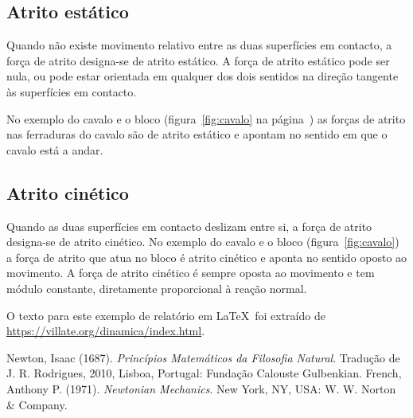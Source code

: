 \documentclass[a4paper,12pt,twosided]{report}
\begin{document}
\subsection{Atrito estático}
Quando não existe movimento relativo entre as duas superfícies em
contacto, a força de atrito designa-se de atrito estático. A força de
atrito estático pode ser nula, ou pode estar orientada em qualquer dos
dois sentidos na direção tangente às superfícies em contacto.

No exemplo do cavalo e o bloco (figura~\ref{fig:cavalo} na
página~\pageref{fig:cavalo}) as forças de atrito nas ferraduras do
cavalo são de atrito estático e apontam no sentido em que o cavalo
está a andar.

\subsection{Atrito cinético}
Quando as duas superfícies em contacto deslizam entre si, a força de
atrito designa-se de atrito cinético. No exemplo do cavalo e o bloco
(figura~\ref{fig:cavalo}) a força de atrito que atua no bloco é atrito
cinético e aponta no sentido oposto ao movimento.
A força de atrito cinético é sempre oposta ao movimento e tem módulo
constante, diretamente proporcional à reação normal.

O texto para este exemplo de relatório em \LaTeX\ foi extraído de
\url{https://villate.org/dinamica/index.html}.

\begin{thebibliography}{9}
  Newton, Isaac (1687). \emph{Princípios Matemáticos da Filosofia
    Natural}. Tradução de J. R. Rodrigues, 2010, Lisboa, Portugal:
  Fundação Calouste Gulbenkian.
  French, Anthony P. (1971). \emph{Newtonian Mechanics}. New York, NY,
  USA: W. W. Norton \& Company.
\end{thebibliography}
\end{document}
